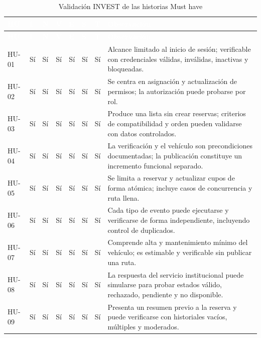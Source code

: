 \documentclass[12pt,a4paper]{article}
\begin{document}
\begin{longtable}{C{1.35cm} C{0.70cm} C{0.70cm} C{0.70cm} C{0.70cm} C{0.70cm} C{0.70cm} L{7.45cm}}
\caption{Validación INVEST de las historias Must have}\label{tab:invest-historias}\\
\textcolor{white}{\textbf{HU}} &
\textcolor{white}{\textbf{I}} &
\textcolor{white}{\textbf{N}} &
\textcolor{white}{\textbf{V}} &
\textcolor{white}{\textbf{E}} &
\textcolor{white}{\textbf{S}} &
\textcolor{white}{\textbf{T}} &
\textcolor{white}{\textbf{Observación}}\\
\endfirsthead
{}
\textcolor{white}{\textbf{HU}} &
\textcolor{white}{\textbf{I}} &
\textcolor{white}{\textbf{N}} &
\textcolor{white}{\textbf{V}} &
\textcolor{white}{\textbf{E}} &
\textcolor{white}{\textbf{S}} &
\textcolor{white}{\textbf{T}} &
\textcolor{white}{\textbf{Observación}}\\
\endhead
HU-01 & Sí & Sí & Sí & Sí & Sí & Sí & Alcance limitado al inicio de sesión; verificable con credenciales válidas, inválidas, inactivas y bloqueadas.\\
HU-02 & Sí & Sí & Sí & Sí & Sí & Sí & Se centra en asignación y actualización de permisos; la autorización puede probarse por rol.\\
HU-03 & Sí & Sí & Sí & Sí & Sí & Sí & Produce una lista sin crear reservas; criterios de compatibilidad y orden pueden validarse con datos controlados.\\
HU-04 & Sí & Sí & Sí & Sí & Sí & Sí & La verificación y el vehículo son precondiciones documentadas; la publicación constituye un incremento funcional separado.\\
HU-05 & Sí & Sí & Sí & Sí & Sí & Sí & Se limita a reservar y actualizar cupos de forma atómica; incluye casos de concurrencia y ruta llena.\\
HU-06 & Sí & Sí & Sí & Sí & Sí & Sí & Cada tipo de evento puede ejecutarse y verificarse de forma independiente, incluyendo control de duplicados.\\
HU-07 & Sí & Sí & Sí & Sí & Sí & Sí & Comprende alta y mantenimiento mínimo del vehículo; es estimable y verificable sin publicar una ruta.\\
HU-08 & Sí & Sí & Sí & Sí & Sí & Sí & La respuesta del servicio institucional puede simularse para probar estados válido, rechazado, pendiente y no disponible.\\
HU-09 & Sí & Sí & Sí & Sí & Sí & Sí & Presenta un resumen previo a la reserva y puede verificarse con historiales vacíos, múltiples y moderados.\\
\end{longtable}
\end{document}
